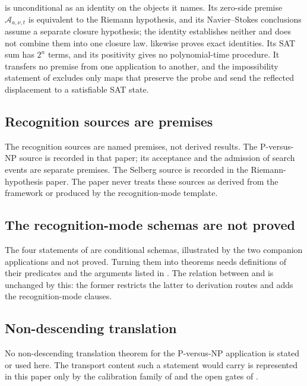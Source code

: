  is unconditional as an identity on the
objects it names.  Its zero-side premise \(\mathcal A_{a,\nu,t}\) is
equivalent to the Riemann hypothesis, and its Navier--Stokes conclusions
assume a separate closure hypothesis; the identity establishes neither
and does not combine them into one closure law.
 likewise proves exact identities.
Its SAT sum has \(2^{n}\) terms, and its positivity gives no
polynomial-time procedure.  It transfers no premise from one
application to another, and the impossibility statement of
 excludes only maps that preserve the probe and
send the reflected displacement to a satisfiable SAT state.

\subsection{Recognition sources are premises}\label{sec:scope:recognition-source-imports}

The recognition sources are named premises, not derived results.  The
P-versus-NP source is recorded in that paper; its acceptance and the
admission of search events are separate premises.  The Selberg source
is recorded in the Riemann-hypothesis paper.
The paper never treats these sources as derived from the framework or
produced by the recognition-mode template.

\subsection{The recognition-mode schemas are not proved}\label{sec:scope:universal-lifting-deferred}

The four statements of  are conditional schemas,
illustrated by the two companion applications and not proved.
Turning them into theorems needs definitions of their predicates and
the arguments listed in .  The relation between
 and 
is unchanged by this: the former restricts the latter to derivation
routes and adds the recognition-mode clauses.

\subsection{Non-descending translation}
\label{sec:scope:m6-theorem-7-folded}

No non-descending translation theorem for the P-versus-NP application
is stated or used here.  The transport content such a statement would
carry is represented in this paper only by the calibration family of
 and the open gates of
.

